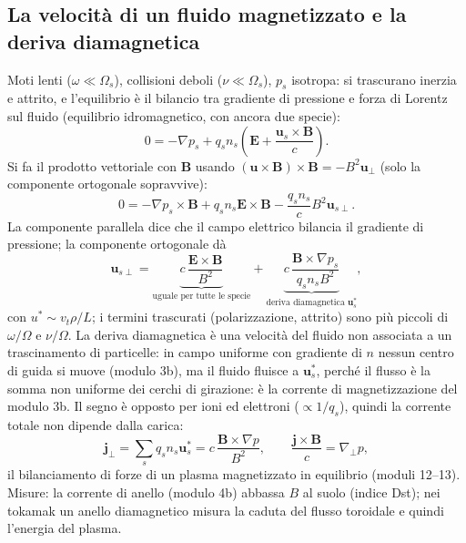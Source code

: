 \subsection{La velocità di un fluido magnetizzato e la deriva diamagnetica}
Moti lenti ($\omega\ll\Omega_s$), collisioni deboli ($\nu\ll\Omega_s$), $p_s$ isotropa: si trascurano inerzia e attrito, e l'equilibrio è il bilancio tra gradiente di pressione e forza di Lorentz sul fluido (equilibrio idromagnetico, con ancora due specie):
\begin{equation}
0=-\nabla p_s+q_sn_s\left(\mathbf{E}+\frac{\mathbf{u}_s\times\mathbf{B}}{c}\right).
\end{equation}
Si fa il prodotto vettoriale con $\mathbf{B}$ usando $(\mathbf{u}\times\mathbf{B})\times\mathbf{B}=-B^2\mathbf{u}_\perp$ (solo la componente ortogonale sopravvive):
\begin{equation}
0=-\nabla p_s\times\mathbf{B}+q_sn_s\mathbf{E}\times\mathbf{B}-\frac{q_sn_s}{c}B^2\mathbf{u}_{s\perp}.
\end{equation}
La componente parallela dice che il campo elettrico bilancia il gradiente di pressione; la componente ortogonale dà
\begin{equation}
\mathbf{u}_{s\perp}=\underbrace{c\,\frac{\mathbf{E}\times\mathbf{B}}{B^2}}_{\text{uguale per tutte le specie}}+\underbrace{c\,\frac{\mathbf{B}\times\nabla p_s}{q_sn_sB^2}}_{\text{deriva diamagnetica }\mathbf{u}^*_s} ,
\end{equation}
con $u^*\sim v_t\rho/L$; i termini trascurati (polarizzazione, attrito) sono più piccoli di $\omega/\Omega$ e $\nu/\Omega$.
La deriva diamagnetica è una velocità del fluido non associata a un trascinamento di particelle: in campo uniforme con gradiente di $n$ nessun centro di guida si muove (modulo 3b), ma il fluido fluisce a $\mathbf{u}^*_s$, perché il flusso è la somma non uniforme dei cerchi di girazione: è la corrente di magnetizzazione del modulo 3b. Il segno è opposto per ioni ed elettroni ($\propto1/q_s$), quindi la corrente totale non dipende dalla carica:
\begin{equation}
\mathbf{j}_\perp=\sum_sq_sn_s\mathbf{u}^*_s=c\,\frac{\mathbf{B}\times\nabla p}{B^2},\qquad\frac{\mathbf{j}\times\mathbf{B}}{c}=\nabla_\perp p,
\end{equation}
il bilanciamento di forze di un plasma magnetizzato in equilibrio (moduli 12--13). Misure: la corrente di anello (modulo 4b) abbassa $B$ al suolo (indice Dst); nei tokamak un anello diamagnetico misura la caduta del flusso toroidale e quindi l'energia del plasma.


